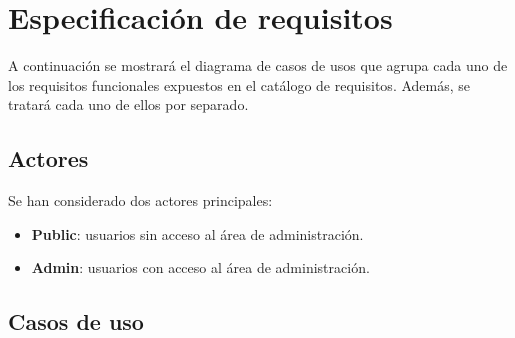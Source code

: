 \section{Especificación de requisitos}

A continuación se mostrará el diagrama de casos de usos que agrupa cada
uno de los requisitos funcionales expuestos en el catálogo de
requisitos. Además, se tratará cada uno de ellos por separado.


\subsection{Actores}

Se han considerado dos actores principales:

\begin{itemize}
\tightlist
\item
  \textbf{Public}: usuarios sin acceso al área de administración.
\item
  \textbf{Admin}: usuarios con acceso al área de administración.
\end{itemize}

\subsection{Casos de uso}

